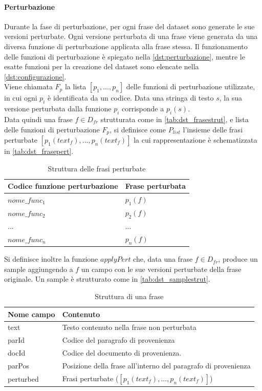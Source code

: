 \paragraph{Perturbazione}
Durante la fase di perturbazione, per ogni frase del dataset sono generate le sue versioni perturbate. Ogni versione perturbata di una frase viene generata da una diversa funzione di perturbazione applicata alla frase stessa. Il funzionamento delle funzioni di perturbazione è spiegato nella \autoref{dst:perturbazione}, mentre le esatte funzioni per la creazione del dataset sono elencate nella \autoref{dst:configurazione}.\\
Viene chiamata $F_p$ la lista $[p_1,...,p_n]$ delle funzioni di perturbazione utilizzate, in cui ogni $p_i$ è identificata da un codice. Data una stringa di testo $s$, la sua versione perturbata dalla funzione $p_i$ corrisponde a $p_i(s)$.\\
Data quindi una frase $f \in D_{fr}$ strutturata come in \autoref{tab:dst_frasestrut}, e lista delle funzioni di perturbazione $F_p$, si definisce come $P_{list}$ l'insieme delle frasi perturbate $[p_1(text_f),...,p_n(text_f)]$ la cui rappresentazione è schematizzata in \autoref{tab:dst_frasepert}.

\begin{table}[H]
\centering
\begin{tabular}{ll}
\textbf{Codice funzione perturbazione} & \textbf{Frase perturbata} \\ \hline
$nome\_func_1$ & $ p_1(f)$\\
$nome\_func_2$ & $ p_2(f)$\\
... &  ...\\
$nome\_func_n$ & $ p_n(f)$\\
\end{tabular}
\caption{Struttura delle frasi perturbate}
\label{tab:dst_frasepert}
\end{table}

Si definisce inoltre la funzione $applyPert$ che, data una frase $f \in D_{fr}$, produce un sample aggiungendo a $f$ un campo con le sue versioni perturbate della frase originale. Un sample è strutturato come in \autoref{tab:dst_samplestrut}.

\begin{table}[H]
\centering
\begin{tabular}{ll}
\textbf{Nome campo} & \textbf{Contenuto} \\ \hline
text  & Testo contenuto nella frase non perturbata\\
parId & Codice del paragrafo di provenienza \\
docId & Codice del documento di provenienza.\\
parPos & Posizione della frase all'interno del paragrafo di provenienza\\
perturbed & Frasi perturbate ($[p_1(text_f),...,p_n(text_f)]$)
\end{tabular}
\caption{Struttura di una frase}
\label{tab:dst_samplestrut}
\end{table}


